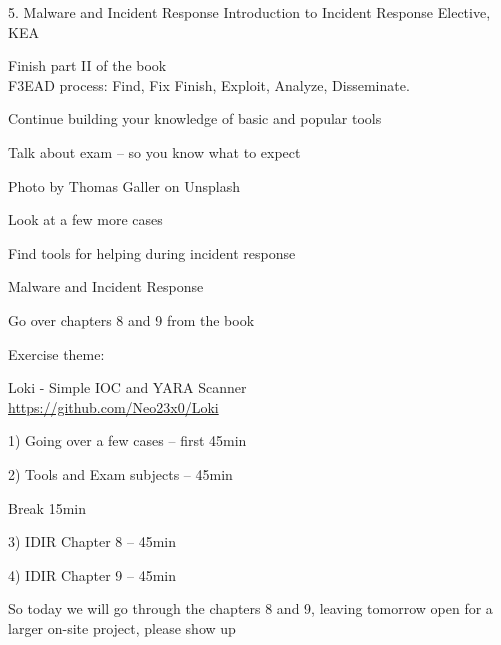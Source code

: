 \documentclass[Screen16to9,17pt]{foils}
\begin{document}
\mytitlepage
{5. Malware and Incident Response}
{Introduction to Incident Response Elective, KEA}




\begin{list2}
\item Finish part II of the book\\
F3EAD process: Find, Fix Finish, Exploit, Analyze, Disseminate.
\item Continue building your knowledge of basic and popular tools
\item Talk about exam -- so you know what to expect
\end{list2}

{\hfill \small Photo by Thomas Galler on Unsplash}


\begin{list2}
\item Look at a few more cases
\item Find tools for helping during incident response
\item Malware and Incident Response
\item Go over chapters 8 and 9 from the book
\end{list2}

Exercise theme:
\begin{list2}
\item Loki - Simple IOC and YARA Scanner\\
\url{https://github.com/Neo23x0/Loki}
\end{list2}


\begin{list2}
\item 1) Going over a few cases -- first 45min
\item 2) Tools and Exam subjects -- 45min
\item Break 15min
\item 3) IDIR Chapter 8 -- 45min
\item 4) IDIR Chapter 9 -- 45min
\end{list2}

So today we will go through the chapters 8 and 9, leaving tomorrow open for a larger on-site project, please show up

\end{document}
